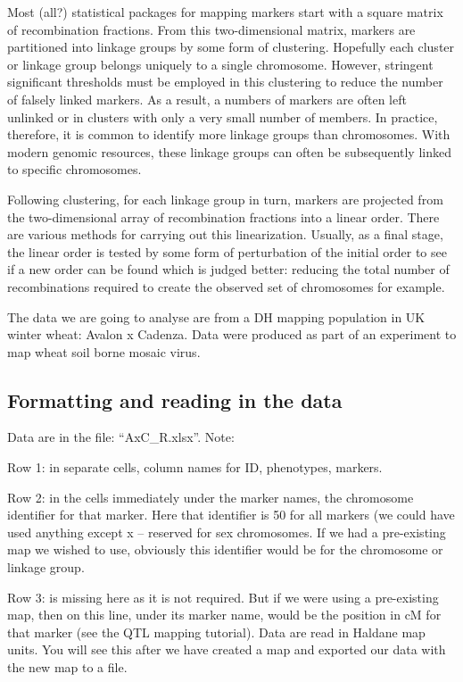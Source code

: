 \documentclass[
]{book}
\begin{document}
Most (all?) statistical packages for mapping markers start with a square matrix of recombination fractions. From this two-dimensional matrix, markers are partitioned into linkage groups by some form of clustering. Hopefully each cluster or linkage group belongs uniquely to a single chromosome. However, stringent significant thresholds must be employed in this clustering to reduce the number of falsely linked markers. As a result, a numbers of markers are often left unlinked or in clusters with only a very small number of members. In practice, therefore, it is common to identify more linkage groups than chromosomes. With modern genomic resources, these linkage groups can often be subsequently linked to specific chromosomes.

Following clustering, for each linkage group in turn, markers are projected from the two-dimensional array of recombination fractions into a linear order. There are various methods for carrying out this linearization. Usually, as a final stage, the linear order is tested by some form of perturbation of the initial order to see if a new order can be found which is judged better: reducing the total number of recombinations required to create the observed set of chromosomes for example.

The data we are going to analyse are from a DH mapping population in UK winter wheat: Avalon x Cadenza. Data were produced as part of an experiment to map wheat soil borne mosaic virus.

\hypertarget{formatting-and-reading-in-the-data}{%
\subsection{Formatting and reading in the data}\label{formatting-and-reading-in-the-data}}

Data are in the file: ``AxC\_R.xlsx''. Note:

Row 1: in separate cells, column names for ID, phenotypes, markers.

Row 2: in the cells immediately under the marker names, the chromosome identifier for
that marker. Here that identifier is 50 for all markers (we could have used anything except x -- reserved for sex chromosomes. If we had a pre-existing map we wished to use, obviously this identifier would be for the chromosome or linkage group.

Row 3: is missing here as it is not required. But if we were using a pre-existing map, then on this line, under its marker name, would be the position in cM for that marker (see
the QTL mapping tutorial). Data are read in Haldane map units. You will see this after
we have created a map and exported our data with the new map to a file.
\end{document}
